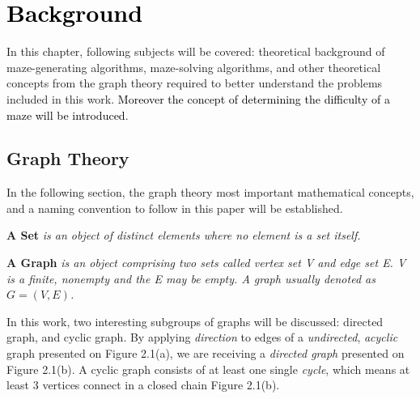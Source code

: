 \chapter{\textcolor{black}{Background}}
In this chapter, following subjects will be covered: theoretical background of maze-generating algorithms, maze-solving algorithms,
and other theoretical concepts from the graph theory required to better understand the problems included in this work. \textcolor{black}{Moreover the concept of determining the difficulty
of a maze will be introduced}. 
\section{Graph Theory}
In the following section, the graph theory most important mathematical concepts, and a naming convention to follow in this paper will be established. 
\begin{definition}\textbf{A Set} \emph{is an object of distinct elements where no element is a set itself\cite{5}.}\end{definition}
\begin{definition}\textbf{A Graph} \emph{is an object comprising two sets called vertex set V and edge set E. V is a finite, nonempty and the E may be empty. A graph usually denoted as $ G = (V, E)$\cite{5}.}\end{definition}
\noindent In this work, two interesting subgroups of graphs will be discussed: directed graph, and cyclic graph. By applying \textit{direction} to edges of a \textit{undirected}, \textit{acyclic} graph presented on Figure 2.1(a), we are receiving a \textit{directed graph} presented on Figure 2.1(b). A cyclic graph consists of at least one single \textit{cycle}, which means at least 3 vertices connect in a closed chain Figure 2.1(b). 
